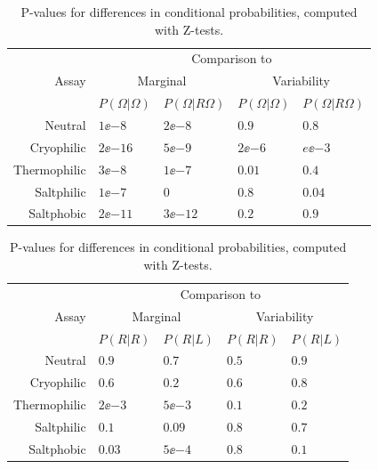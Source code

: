 \documentclass[12pt]{article}
\begin{document}
\begin{table}
  \begin{center}
  \begin{tabular}{|r|l|l|l|l|}
    \hline
    \multirow{3}{*}{Assay} & \multicolumn{4}{|c|}{Comparison to} \\
    \cline{2-5}
      & \multicolumn{2}{|c|}{Marginal} & \multicolumn{2}{|c|}{Variability} \\
      \cline{2-5}
      & $P(\Omega|\Omega)$ & $P(\Omega|R\Omega)$ & $P(\Omega|\Omega)$ & $P(\Omega|R\Omega)$ \\
    \hline
    Neutral      & $1\ee{-8}$ & $2\ee{-8}$ & $0.9$ & $0.8$ \\
    Cryophilic   & $2\ee{-16}$ & $5\ee{-9}$ & $2\ee{-6}$ & $e\ee{-3}$ \\
    Thermophilic & $3\ee{-8}$ & $1\ee{-7}$ & $0.01$ & $0.4$ \\
    Saltphilic   & $1\ee{-7}$ & $0$ & $0.8$ & $0.04$ \\
    Saltphobic   & $2\ee{-11}$ & $3\ee{-12}$ & $0.2$ & $0.9$ \\
    \hline
  \end{tabular}

  \vspace{1cm}

  \begin{tabular}{|r|l|l|l|l|}
    \hline
    \multirow{3}{*}{Assay} & \multicolumn{4}{|c|}{Comparison to} \\
    \cline{2-5}
      & \multicolumn{2}{|c|}{Marginal} & \multicolumn{2}{|c|}{Variability} \\
      \cline{2-5}
      & $P(R|R)$ & $P(R|L)$ & $P(R|R)$ & $P(R|L)$ \\
    \hline
    Neutral      & $0.9$ & $0.7$ & $0.5$ & $0.9$ \\
    Cryophilic   & $0.6$ & $0.2$ & $0.6$ & $0.8$ \\
    Thermophilic & $2\ee{-3}$ & $5\ee{-3}$ & $0.1$ & $0.2$ \\
    Saltphilic   & $0.1$ & $0.09$ & $0.8$ & $0.7$ \\
    Saltphobic   & $0.03$ & $5\ee{-4}$ & $0.8$ & $0.1$ \\
    \hline
  \end{tabular}
  \end{center}
  \caption[P-values for differences in conditional probabilities.]{P-values for differences in conditional probabilities, computed with Z-tests.}\label{tab:condpval}
\end{table}
\end{document}

